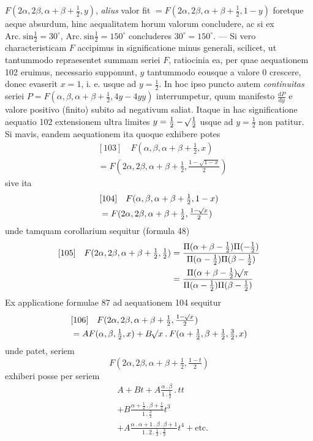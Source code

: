 $F(2\alpha,2\beta,\alpha+\beta+\frac12,y)$, \textit{alius} valor fit $=F(2\alpha,2\beta,\alpha+\beta+\frac12,1-y)$ foretque aeque
absurdum, hinc aequalitatem horum valorum concludere, ac si ex $\mathrm{Arc.\ sin}\frac12=30^\circ$,
$\mathrm{Arc.\ sin}\frac12=150^\circ$ concluderes $30^\circ=150^\circ$. --- Si vero characteristicam $F$ accipimus in significatione minus generali, scilicet, ut tantummodo repraesentet summam seriei $F$, ratiocinia ea, per quae aequationem 102 eruimus, necessario supponunt, $y$ tantummodo eousque a valore 0 crescere, donec evaserit $x=1$, i. e. usque ad
$y=\frac12$. In hoc ipso puncto autem \textit{continuitas} seriei $P=F(\alpha,\beta,\alpha+\beta+\frac12,4y-4yy)$
interrumpetur, quum manifesto $\frac{\mathrm dP}{\mathrm dy}$ e valore positivo (finito) subito ad negativum saliat. Itaque in hac significatione aequatio 102 extensionem ultra limites
$y=\frac12-\mathord{{}^{}\!\surd}\frac12$ usque ad $y=\frac12$ non patitur. Si mavis, eandem aequationem ita
quoque exhibere potes
\[
\begin{aligned}&[103]\quad F(\alpha,\beta,\alpha+\beta+\tfrac12,x)\\&=F(2\alpha,2\beta,\alpha+\beta+\tfrac12,\tfrac{1-\sqrt{1-x}}2)\end{aligned}
\]
sive ita
\[
\begin{aligned}&[104]\quad F(\alpha,\beta,\alpha+\beta+\tfrac12,1-x)\\&=F(2\alpha,2\beta,\alpha+\beta+\tfrac12,\tfrac{1-\mathord{{}^{}\!\surd}x}2)\end{aligned}
\]
unde tamquam corollarium sequitur (formula 48)
\[
\begin{aligned}
{}[105]\quad F(2\alpha,2\beta,\alpha+\beta+\tfrac12,\tfrac12)&=\frac{\Pi(\alpha+\beta-\tfrac12)\Pi(-\tfrac12)}{\Pi(\alpha-\tfrac12)\Pi(\beta-\tfrac12)}\\
&=\frac{\Pi(\alpha+\beta-\tfrac12)\mathord{{}^{}\!\surd}\pi}{\Pi(\alpha-\tfrac12)\Pi(\beta-\tfrac12)}
\end{aligned}
\]
Ex applicatione formulae 87 ad aequationem 104 sequitur
\[
\begin{aligned}&[106]\quad F(2\alpha,2\beta,\alpha+\beta+\tfrac12,\tfrac{1-\mathord{{}^{}\!\surd}x}2)\\&=AF(\alpha,\beta,\tfrac12,x)+B\mathord{{}^{}\!\surd}x\mathbin{.}F(\alpha+\tfrac12,\beta+\tfrac12,\tfrac32,x)\end{aligned}
\]
unde patet, seriem
\[
F(2\alpha,2\beta,\alpha+\beta+\tfrac12,\tfrac{1-t}2)
\]
exhiberi posse per seriem
\[
\begin{aligned}&A+Bt+A\frac{\alpha\mathbin{.}\beta}{1\mathbin{.}\tfrac12}\mathbin{.}tt\\&+B\frac{\alpha+\tfrac12\mathbin{.}\beta+\tfrac12}{1\mathbin{.}\tfrac32}t^3\\&+A\frac{\alpha\mathbin{.}\alpha+1\mathbin{.}\beta\mathbin{.}\beta+1}{1\mathbin{.}2\mathbin{.}\tfrac12\mathbin{.}\tfrac32}t^4+\text{etc.}\end{aligned}
\]
